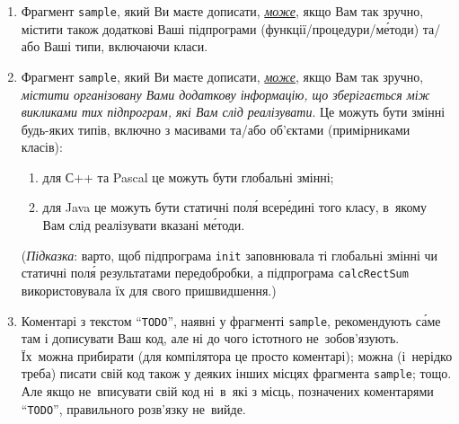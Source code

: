 \begin{enumerate}
Фрагмент \texttt{sample}, який Ви маєте дописати, зобов'язаний містити реалізацію кожної з підпрограм (функцій/\nolinebreak[3]процедур/\nolinebreak[3]м\'{е}тодів), які Вам дано завдання реалізувати. Навіть якщо Ви вважаєте, що така дія непотрібна для досягнення остат\'{о}чного результату (що с\'{а}ме в цій задачі, насправді, не~так)\nolinebreak[3] --- хоча~б не~прибирайте вже наявні оголошення й порожні реалізації.
\item
Фрагмент \texttt{sample}, який Ви маєте дописати, \underline{\emph{може}}, якщо Вам так зручно, містити також додаткові Ваші підпрограми (функції/\nolinebreak[3]процедури/\nolinebreak[3]м\'{е}тоди) та/або Ваші типи, включаючи класи.
\item
Фрагмент \texttt{sample}, який Ви маєте дописати, \underline{\emph{може}}, якщо Вам так зручно, \emph{містити організовану Вами додаткову інформацію, що зберігається між викликами тих підпрограм, які Вам слід реалізувати}.
Це можуть бути змінні будь-яких типів, включно з масивами та/або об'єктами (примірниками класів):
\begin{enumerate}
\item
для С++ та Pascal це можуть бути глобальні змінні;
\item
для Java це можуть бути статичні пол\'{я} всер\'{е}дині того класу, в~якому Вам слід реалізувати вказані м\'{е}тоди.
\end{enumerate}
(\emph{Підказка}: варто, щоб підпрограма \texttt{init} заповнювала ті глобальні змінні чи статичні пол\'{я} результатами передобробки, а підпрограма \texttt{calcRectSum} використовувала їх для свого пришвидшення.)
\item
Коментарі з текстом ``\texttt{TODO}'', наявні у фрагменті \texttt{sample}, рекомендують с\'{а}ме там і дописувати Ваш код, але ні до чого істотного не~зобов'язують. Їх~можна прибирати (для компілятора це просто коментарі); можна (і~нерідко треба) писати свій код також у деяких інших місцях фрагмента \texttt{sample}; тощо. Але якщо не~вписувати свій код ні~в~які з місць, позначених коментарями ``\texttt{TODO}'', правильного розв'язку не~вийде.
\end{enumerate}


